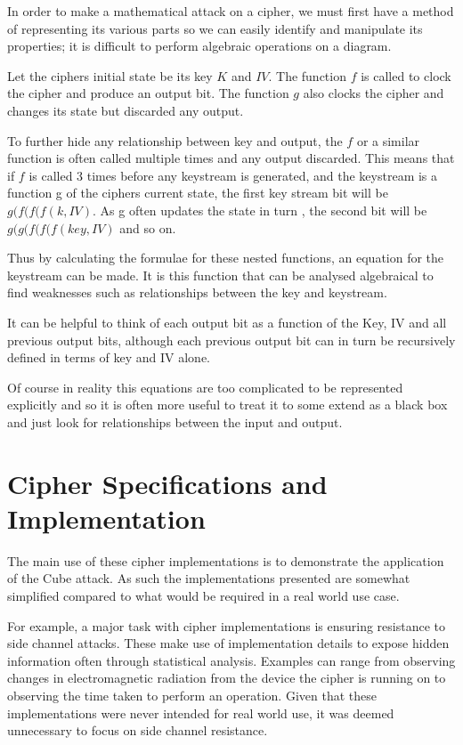 \documentclass{report}
\begin{document}
In order to make a mathematical attack on a cipher, we must first have a method
of representing its various parts so we can easily identify and manipulate its properties; it is difficult to perform algebraic operations on a diagram.

Let the ciphers initial state be its key $K$ and $IV$. The function $f$ is called to clock the cipher and produce an output bit. The function $g$ also clocks the cipher and changes its state but discarded any output.

To further hide any relationship between key and output, the $f$ or a similar function is often called multiple times and any output discarded. This means that if $f$ is called 3 times before any keystream is generated, and the keystream is a function g of the ciphers current state, the first key stream bit will be $g(f(f(f(k, IV)$. As g often updates the state in turn , the second bit will be $g(g(f(f(f(key, IV)$ and so on.

Thus by calculating the formulae for these nested functions, an equation for the keystream can be made. It is this function that can be analysed algebraical to find weaknesses such as relationships between the key and keystream.

It can be helpful to think of each output bit as a function of the Key, IV and all previous output bits, although each previous output bit can in turn be recursively defined in terms of key and IV alone.


Of course in reality this equations are too complicated to be represented explicitly and so it is often more useful to treat it to some extend as a black box and just look for relationships between the input and output.
\chapter{Cipher Specifications  and Implementation}
The main use of these cipher implementations is to demonstrate the application of the Cube attack. As such the implementations presented are somewhat simplified compared to what would be required in a real world use case.

For example, a major task with cipher implementations is ensuring resistance to side channel attacks. These make use of implementation details to expose hidden information often through statistical analysis. Examples can range from observing changes in electromagnetic radiation from the device the cipher is running on\cite{electroSide} to observing the time taken to perform an operation\cite{timingAttack}. Given that these implementations were never intended for real world use, it was deemed unnecessary to focus on side channel resistance.
\end{document}
